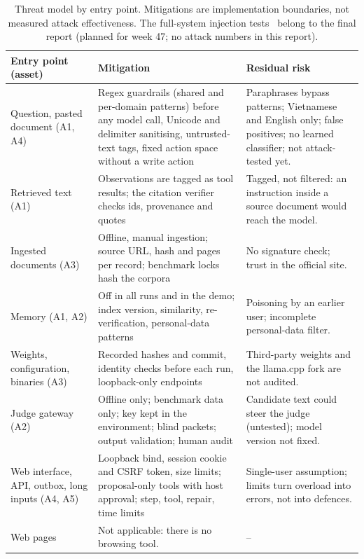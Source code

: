 \begin{table}[!htbp]\tabstyle
\begin{tabularx}{\textwidth}{@{}L{3.0cm}L{6.3cm}Y@{}}
\toprule Entry point (asset) & Mitigation & Residual risk\\\midrule
Question, pasted document (A1, A4) & Regex guardrails (shared and per-domain patterns) before any model call, Unicode and delimiter sanitising, untrusted-text tags, fixed action space without a write action & Paraphrases bypass patterns; Vietnamese and English only; false positives; no learned classifier; not attack-tested yet.\\
Retrieved text (A1) & Observations are tagged as tool results; the citation verifier checks ids, provenance and quotes & Tagged, not filtered: an instruction inside a source document would reach the model.\\
Ingested documents (A3) & Offline, manual ingestion; source URL, hash and pages per record; benchmark locks hash the corpora & No signature check; trust in the official site.\\
Memory (A1, A2) & Off in all runs and in the demo; index version, similarity, re-verification, personal-data patterns & Poisoning by an earlier user; incomplete personal-data filter.\\
Weights, configuration, binaries (A3) & Recorded hashes and commit, identity checks before each run, loopback-only endpoints & Third-party weights and the llama.cpp fork are not audited.\\
Judge gateway (A2) & Offline only; benchmark data only; key kept in the environment; blind packets; output validation; human audit & Candidate text could steer the judge (untested); model version not fixed.\\
Web interface, API, outbox, long inputs (A4, A5) & Loopback bind, session cookie and CSRF token, size limits; proposal-only tools with host approval; step, tool, repair, time limits & Single-user assumption; limits turn overload into errors, not into defences.\\
Web pages & Not applicable: there is no browsing tool. & --\\
\bottomrule\end{tabularx}
\caption{Threat model by entry point. Mitigations are implementation boundaries, not measured attack effectiveness. The full-system injection tests~\citep{greshake2023indirect,debenedetti2024agentdojo} belong to the final report (planned for week 47; no attack numbers in this report).}\label{tab:threat}
\end{table}
